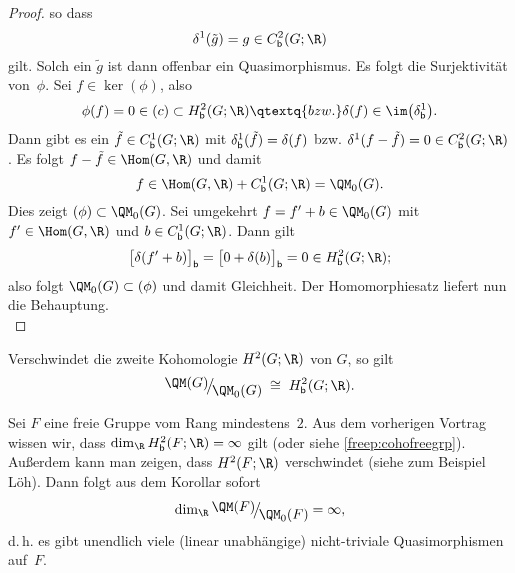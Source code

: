\begin{proof}
    so dass 
    \[ \delta^1(\tilde g) = g \in \Cb^2(G;\R) \]
    gilt. Solch ein $\tilde g$ ist dann offenbar ein Quasimorphismus. Es folgt
    die Surjektivität von~$\phi$. Sei $f\in\ker(\phi)$, also
    \[ \phi(f) = 0 \in\ker(c) \subset \Hb^2(G;\R)  \qtextq{bzw.}
        \delta(f) \in \im\bigl(\delta^1_\bd\bigr)
    . \]
    Dann gibt es ein $\tilde f\in\Cb^1(G;\R)$ mit $\delta^1_{\mathsf{b}}(\tilde f)
    = \delta(f)$ bzw. $\delta^1(f - \tilde f) = 0 \in\Cb^2(G;\R)$.
    Es folgt $f - \tilde f \in\Hom(G,\R)$ und damit
    \[ f \in \Hom(G,\R) + \Cb^1(G;\R) = \QM_0(G)  . \]
    Dies zeigt $\ker(\phi) \subset \QM_0(G)$. Sei umgekehrt
    $f = f'+b \in\QM_0(G)$ mit $f'\in\Hom(G,\R)$ und $b\in\Cb^1(G;\R)$.
    Dann gilt
    \[ \bigl[\delta(f'+b)\bigr]_\bd 
        = \bigl[0 + \delta(b)\bigr]_\bd = 0 \in \Hb^2(G;\R)
    ; \]
    also folgt $\QM_0(G) \subset \ker(\phi)$ und damit Gleichheit. Der
    Homomorphiesatz liefert nun die Behauptung.
    \\
\end{proof}

\begin{thKorollar}
    Verschwindet die zweite Kohomologie $H^2(G;\R)$ von $G$, so gilt
    \[ \Quot{\QM(G)}{\QM_0(G)} \;\cong\; \Hb^2(G;\R)  . \]
\end{thKorollar}

\begin{thBeispiel}
    Sei $F$ eine freie Gruppe vom Rang mindestens~$2$. Aus dem vorherigen
    Vortrag wissen wir, dass $\dim_{\R} \Hb^2(F;\R) = \infty$ gilt (oder siehe
    \cref{freep:cohofreegrp}). Außerdem kann man zeigen, dass $H^2(F;\R)$
    verschwindet (siehe zum Beispiel
    Löh\cite[Ch.\,1,.4,\;Example~1.3.13]{lecnotes:loeh:bdcoho}).
    Dann folgt aus dem Korollar sofort
    \[ \dim_{\R} \Quot{\QM(F)}{\QM_0(F)} = \infty  , \]
    d.\,h. es gibt unendlich viele (linear unabhängige) nicht-triviale
    Quasimorphismen auf~$F$.
\end{thBeispiel}
